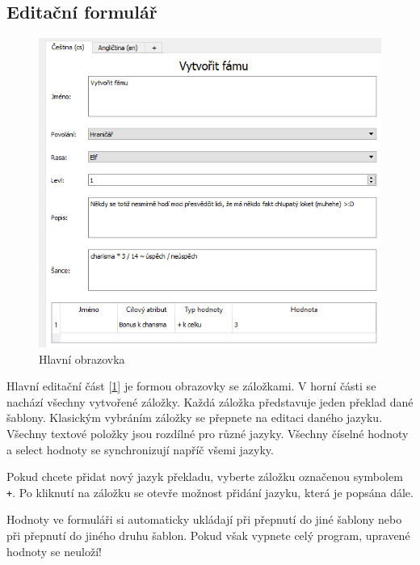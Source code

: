 \documentclass[12pt,a4paper,oneside]{article}
\begin{document}
\subsection{Editační formulář}	
\begin{figure}[h]
  		\centering
  		\begin{minipage}[t]{1\textwidth}
    		\includegraphics[width=\linewidth]{images/editace_formular}
    		\caption{Hlavní obrazovka}
    		\label{fig:editace_formular}
  		\end{minipage}
  		
  		\vfill
	\end{figure}
Hlavní editační část [\ref{fig:editace_formular}] je formou obrazovky se záložkami. V horní části se nachází všechny vytvořené záložky. Každá záložka představuje jeden překlad dané šablony. Klasickým vybráním záložky se přepnete na editaci daného jazyku. Všechny textové položky jsou rozdílné pro různé jazyky. Všechny číselné hodnoty a select hodnoty se synchronizují napříč všemi jazyky. \par

	Pokud chcete přidat nový jazyk překladu, vyberte záložku označenou symbolem \texttt{+}. Po kliknutí na záložku se otevře možnost přidání jazyku, která je popsána dále. \par
	
	Hodnoty ve formuláři si automaticky ukládají při přepnutí do jiné šablony nebo při přepnutí do jiného druhu šablon. Pokud však vypnete celý program, upravené hodnoty se neuloží!
	
\end{document}
